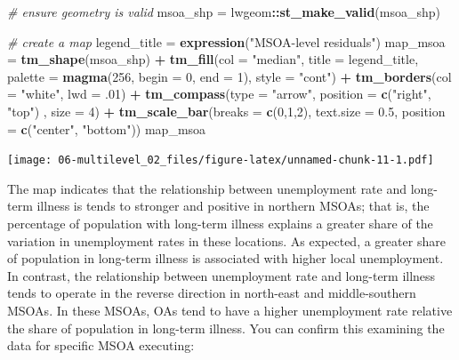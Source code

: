 \documentclass[]{book}
\newenvironment{Shaded}{\begin{snugshade}}{\end{snugshade}}
\newcommand{\KeywordTok}[1]{\textcolor[rgb]{0.13,0.29,0.53}{\textbf{#1}}}
\newcommand{\DataTypeTok}[1]{\textcolor[rgb]{0.13,0.29,0.53}{#1}}
\newcommand{\DecValTok}[1]{\textcolor[rgb]{0.00,0.00,0.81}{#1}}
\newcommand{\FloatTok}[1]{\textcolor[rgb]{0.00,0.00,0.81}{#1}}
\newcommand{\StringTok}[1]{\textcolor[rgb]{0.31,0.60,0.02}{#1}}
\newcommand{\CommentTok}[1]{\textcolor[rgb]{0.56,0.35,0.01}{\textit{#1}}}
\newcommand{\OperatorTok}[1]{\textcolor[rgb]{0.81,0.36,0.00}{\textbf{#1}}}
\newcommand{\NormalTok}[1]{#1}
\begin{document}
\begin{Shaded}
\begin{Highlighting}[]
\CommentTok{# ensure geometry is valid}
\NormalTok{msoa_shp =}\StringTok{ }\NormalTok{lwgeom}\OperatorTok{::}\KeywordTok{st_make_valid}\NormalTok{(msoa_shp)}

\CommentTok{# create a map}
\NormalTok{legend_title =}\StringTok{ }\KeywordTok{expression}\NormalTok{(}\StringTok{"MSOA-level residuals"}\NormalTok{)}
\NormalTok{map_msoa =}\StringTok{ }\KeywordTok{tm_shape}\NormalTok{(msoa_shp) }\OperatorTok{+}
\StringTok{  }\KeywordTok{tm_fill}\NormalTok{(}\DataTypeTok{col =} \StringTok{"median"}\NormalTok{, }\DataTypeTok{title =}\NormalTok{ legend_title, }\DataTypeTok{palette =} \KeywordTok{magma}\NormalTok{(}\DecValTok{256}\NormalTok{, }\DataTypeTok{begin =} \DecValTok{0}\NormalTok{, }\DataTypeTok{end =} \DecValTok{1}\NormalTok{), }\DataTypeTok{style =} \StringTok{"cont"}\NormalTok{) }\OperatorTok{+}\StringTok{ }
\StringTok{  }\KeywordTok{tm_borders}\NormalTok{(}\DataTypeTok{col =} \StringTok{"white"}\NormalTok{, }\DataTypeTok{lwd =}\NormalTok{ .}\DecValTok{01}\NormalTok{)  }\OperatorTok{+}\StringTok{ }
\StringTok{  }\KeywordTok{tm_compass}\NormalTok{(}\DataTypeTok{type =} \StringTok{"arrow"}\NormalTok{, }\DataTypeTok{position =} \KeywordTok{c}\NormalTok{(}\StringTok{"right"}\NormalTok{, }\StringTok{"top"}\NormalTok{) , }\DataTypeTok{size =} \DecValTok{4}\NormalTok{) }\OperatorTok{+}\StringTok{ }
\StringTok{  }\KeywordTok{tm_scale_bar}\NormalTok{(}\DataTypeTok{breaks =} \KeywordTok{c}\NormalTok{(}\DecValTok{0}\NormalTok{,}\DecValTok{1}\NormalTok{,}\DecValTok{2}\NormalTok{), }\DataTypeTok{text.size =} \FloatTok{0.5}\NormalTok{, }\DataTypeTok{position =}  \KeywordTok{c}\NormalTok{(}\StringTok{"center"}\NormalTok{, }\StringTok{"bottom"}\NormalTok{)) }
\NormalTok{map_msoa}
\end{Highlighting}
\end{Shaded}

\texttt{[image: 06-multilevel\_02\_files/figure-latex/unnamed-chunk-11-1.pdf]}

The map indicates that the relationship between unemployment rate and
long-term illness is tends to stronger and positive in northern MSOAs;
that is, the percentage of population with long-term illness explains a
greater share of the variation in unemployment rates in these locations.
As expected, a greater share of population in long-term illness is
associated with higher local unemployment. In contrast, the relationship
between unemployment rate and long-term illness tends to operate in the
reverse direction in north-east and middle-southern MSOAs. In these
MSOAs, OAs tend to have a higher unemployment rate relative the share of
population in long-term illness. You can confirm this examining the data
for specific MSOA executing:
\end{document}
